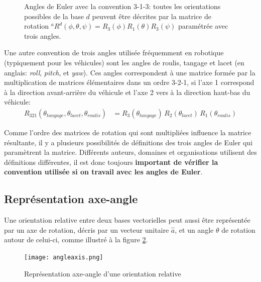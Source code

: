 \begin{figure}[H]
	\centering
	\caption{Angles de Euler avec la convention 3-1-3: toutes les orientations possibles de la base $d$ peuvent être décrites par la matrice de rotation ${}^aR^d(\phi,\theta,\psi) = R_3(\phi)R_1(\theta)R_3(\psi)$ paramétrée avec trois angles.}
	\label{fig:euler}
\end{figure}
%
Une autre convention de trois angles utilisée fréquemment en robotique (typiquement pour les véhicules) sont les angles de roulis, tangage et lacet (en anglais: \textit{roll}, \textit{pitch}, et \textit{yaw}). Ces angles correspondent à une matrice formée par la multiplication de matrices élémentaires dans un ordre 3-2-1, si l'axe 1 correspond à la direction avant-arrière du véhicule et l'axe 2 vers à la direction haut-bas du véhicule:
\begin{align}
	R_{321}(\theta_{tangage}, \theta_{lacet}, \theta_{roulis}) &= R_3( \theta_{tangage} ) \, R_2( \theta_{lacet} ) \, R_1( \theta_{roulis} )
\end{align}

Comme l'ordre des matrices de rotation qui sont multipliées influence la matrice résultante, il y a plusieurs possibilités de définitions des trois angles de Euler qui paramètrent la matrice. Différents auteurs, domaines et organisations utilisent des définitions différentes, il est donc toujours \textbf{important de vérifier la convention utilisée si on travail avec les angles de Euler}.





\subsection{Représentation axe-angle}
\label{sec:rotaxe}
Une orientation relative entre deux bases vectorielles peut aussi être représentée par un axe de rotation, décris par un vecteur unitaire $\hat{a}$, et un angle $\theta$ de rotation autour de celui-ci, comme illustré à la figure \ref{fig:angleaxis}.
\begin{figure}[htbp]
	\centering
	\texttt{[image: angleaxis.png]}
	\caption{Représentation axe-angle d'une orientation relative}
	\label{fig:angleaxis}
\end{figure}

